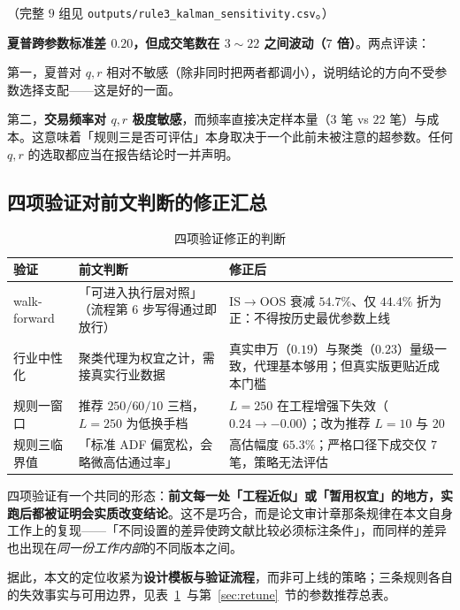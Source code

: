（完整 $9$ 组见 \texttt{outputs/rule3\_kalman\_sensitivity.csv}。）

\textbf{夏普跨参数标准差 $0.20$，但成交笔数在 $3\sim22$ 之间波动（$7$ 倍）}。两点评读：

第一，夏普对 $q,r$ 相对不敏感（除非同时把两者都调小），说明结论的方向不受参数选择支配——这是好的一面。

第二，\textbf{交易频率对 $q,r$ 极度敏感}，而频率直接决定样本量（$3$ 笔 vs $22$ 笔）与成本。这意味着「规则三是否可评估」本身取决于一个此前未被注意的超参数。任何 $q,r$ 的选取都应当在报告结论时一并声明。

\subsection{四项验证对前文判断的修正汇总}

\begin{table}[htbp]
\centering\footnotesize
\caption{四项验证修正的判断}\label{tab:corrections}
\begin{tabular}{@{}>{\raggedright\arraybackslash}p{2.8cm}>{\raggedright\arraybackslash}p{5.0cm}>{\raggedright\arraybackslash}p{5.2cm}@{}}
\toprule
\textbf{验证} & \textbf{前文判断} & \textbf{修正后} \\
\midrule
walk-forward & 「可进入执行层对照」（流程第 6 步写得通过即放行） & IS$\to$OOS 衰减 $54.7\%$、仅 $44.4\%$ 折为正：不得按历史最优参数上线 \\
行业中性化 & 聚类代理为权宜之计，需接真实行业数据 & 真实申万（$0.19$）与聚类（$0.23$）量级一致，代理基本够用；但真实版更贴近成本门槛 \\
规则一窗口 & 推荐 $250/60/10$ 三档，$L=250$ 为低换手档 & $L=250$ 在工程增强下失效（$0.24\to-0.00$）；改为推荐 $L=10$ 与 $20$ \\
规则三临界值 & 「标准 ADF 偏宽松，会略微高估通过率」 & 高估幅度 $65.3\%$；严格口径下成交仅 $7$ 笔，策略无法评估 \\
\bottomrule
\end{tabular}
\end{table}

四项验证有一个共同的形态：\textbf{前文每一处「工程近似」或「暂用权宜」的地方，实跑后都被证明会实质改变结论}。这不是巧合，而是论文审计章那条规律在本文自身工作上的复现——「不同设置的差异使跨文献比较必须标注条件」，而同样的差异也出现在\emph{同一份工作内部}的不同版本之间。

据此，本文的定位收紧为\textbf{设计模板与验证流程}，而非可上线的策略；三条规则各自的失效事实与可用边界，见表~\ref{tab:corrections}~与第~\ref{sec:retune}~节的参数推荐总表。
